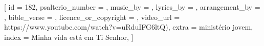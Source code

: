 [
    id                     = {182},
    psalterio_number       = {},
    music_by               = {},
    lyrics_by              = {},
    arrangement_by         = {},
    bible_verse            = {},
    licence_or_copyright   = {},
    video_url              = {https://www.youtube.com/watch?v=uRduIFG6ltQ)},
    extra                  = {ministério jovem},
    index                  = {Minha vida está em Ti Senhor},
]


\beginverse


\endverse


\beginchorus


\endchorus


\beginverse


\endverse



\endsong
